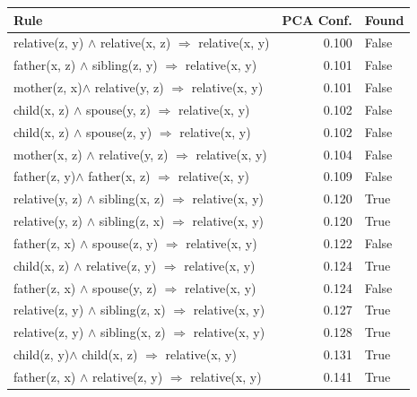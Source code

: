 \begin{longtable}{lrl}
\toprule
                                                    Rule &  PCA Conf. &  Found \\
\midrule
relative(z, y)  $\wedge$ relative(x, z)   $\Rightarrow$ relative(x, y) &           0.100 &                    False \\
   father(x, z) $\wedge$ sibling(z, y)   $\Rightarrow$ relative(x, y) &           0.101 &                    False \\
  mother(z, x)$\wedge$ relative(y, z)   $\Rightarrow$ relative(x, y) &           0.101 &                    False \\
     child(x, z)  $\wedge$ spouse(y, z)   $\Rightarrow$ relative(x, y) &           0.102 &                    False \\
     child(x, z) $\wedge$ spouse(z, y)   $\Rightarrow$ relative(x, y) &           0.102 &                    False \\
  mother(x, z) $\wedge$ relative(y, z)   $\Rightarrow$ relative(x, y) &           0.104 &                    False \\
    father(z, y)$\wedge$  father(x, z)   $\Rightarrow$ relative(x, y) &           0.109 &                    False \\
 relative(y, z) $\wedge$ sibling(x, z)   $\Rightarrow$ relative(x, y) &           0.120 &                     True \\
 relative(y, z) $\wedge$ sibling(z, x)   $\Rightarrow$ relative(x, y) &           0.120 &                     True \\
    father(z, x) $\wedge$ spouse(z, y)   $\Rightarrow$ relative(x, y) &           0.122 &                    False \\
   child(x, z) $\wedge$ relative(z, y)   $\Rightarrow$ relative(x, y) &           0.124 &                     True \\
    father(z, x) $\wedge$ spouse(y, z)   $\Rightarrow$ relative(x, y) &           0.124 &                    False \\
 relative(z, y) $\wedge$ sibling(z, x)   $\Rightarrow$ relative(x, y) &           0.127 &                     True \\
 relative(z, y) $\wedge$ sibling(x, z)   $\Rightarrow$ relative(x, y) &           0.128 &                     True \\
      child(z, y)$\wedge$  child(x, z)   $\Rightarrow$ relative(x, y) &           0.131 &                     True \\
  father(z, x) $\wedge$ relative(z, y)   $\Rightarrow$ relative(x, y) &           0.141 &                     True \\

\end{longtable}
